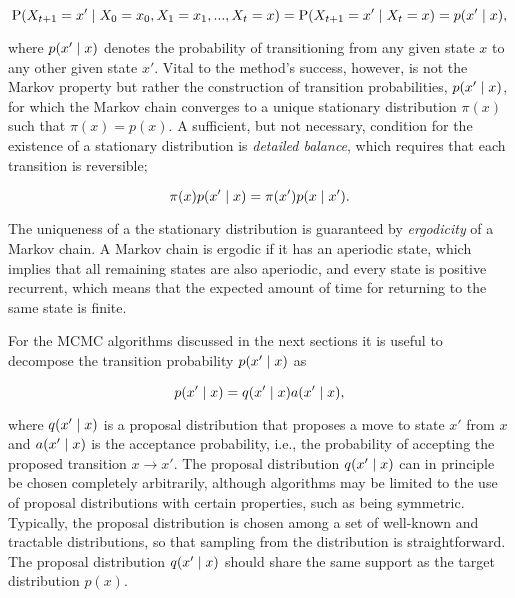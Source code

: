 \begin{equation*}
    \mathrm{P} \qty( X_{t+1} = x' \mid X_0 = x_0, X_1 = x_1, ..., X_t = x) = \mathrm{P} \qty( X_{t+1} = x' \mid X_t = x) = p \qty(x' \mid x),
\end{equation*}

where $p \qty(x' \mid x)$ denotes the probability of transitioning from any given state $x$ to any other given state $x'$. Vital to the method's success, however, is not the Markov property but rather the construction of transition probabilities, $p \qty(x' \mid x)$, for which the Markov chain converges to a unique stationary distribution $\pi(x)$ such that $\pi(x) = p(x)$. A sufficient, but not necessary, condition for the existence of a stationary distribution is \textit{detailed balance}, which requires that each transition is reversible; 

\begin{equation}\label{eq:detailed_balance}
    \pi(x) p \qty(x' \mid x) = \pi \qty(x') p \qty(x \mid x').
\end{equation}

The uniqueness of a the stationary distribution is guaranteed by \textit{ergodicity} of a Markov chain. A Markov chain is ergodic if it has an aperiodic state, which implies that all remaining states are also aperiodic, and every state is positive recurrent, which means that the expected amount of time for returning to the same state is finite.   

For the MCMC algorithms discussed in the next sections it is useful to decompose the transition probability $p \qty(x' \mid x)$ as  

\begin{equation*}
     p \qty(x' \mid x) = q \qty(x' \mid x)  a \qty(x' \mid x),
\end{equation*}

where $q \qty(x' \mid x)$ is a proposal distribution that proposes a move to state $x'$ from $x$ and $a \qty(x' \mid x)$ is the acceptance probability, i.e., the probability of accepting the proposed transition $x \to x'$. The proposal distribution $q \qty(x' \mid x)$ can in principle be chosen completely arbitrarily, although algorithms may be limited to the use of proposal distributions with certain properties, such as being symmetric. Typically, the proposal distribution is chosen among a set of well-known and tractable distributions, so that sampling from the distribution is straightforward. The proposal distribution $q \qty(x' \mid x)$ should share the same support as the target distribution $p(x)$.

